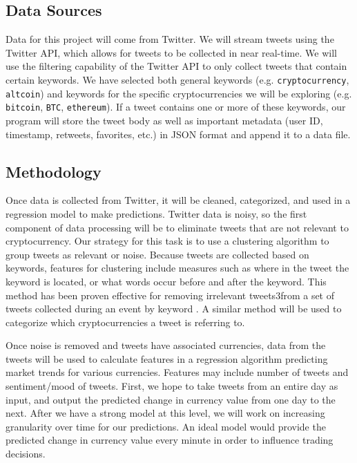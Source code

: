 \documentclass[sigconf]{acmart}
\newcommand{\code}{\texttt}
\begin{document}
\subsection{Data Sources}
Data for this project will come from Twitter. We will stream tweets using the Twitter API, which allows for tweets to be collected in near real-time. We will use the filtering capability of the Twitter API to only collect tweets that contain certain keywords\cite{sakai}. We have selected both general keywords (e.g. \code{cryptocurrency}, \code{altcoin}) and keywords for the specific cryptocurrencies we will be exploring (e.g. \code{bitcoin}, \code{BTC}, \code{ethereum}). If a tweet contains one or more of these keywords, our program will store the tweet body as well as important metadata (user ID, timestamp, retweets, favorites, etc.) in JSON format and append it to a data file.

\subsection{Methodology}
Once data is collected from Twitter, it will be cleaned, categorized, and used in a regression model to make predictions. Twitter data is noisy, so the first component of data processing will be to eliminate tweets that are not relevant to cryptocurrency. Our strategy for this task is to use a clustering algorithm to group tweets as relevant or noise. Because tweets are collected based on keywords, features for clustering include measures such as where in the tweet the keyword is located, or what words occur before and after the keyword. This method has been proven effective for removing irrelevant tweets3from a set of tweets collected during an event by keyword . A similar method will be used to categorize which cryptocurrencies a tweet is referring to.

Once noise is removed and tweets have associated currencies, data from the tweets will be used to calculate features in a regression algorithm predicting market trends for various currencies. Features may include number of tweets and sentiment/mood of tweets. First, we hope to take tweets from an entire day as input, and output the predicted change in currency value from one day to the next. After we have a strong model at this level, we will work on increasing granularity over time for our predictions. An ideal model would provide the predicted change in currency value every minute in order to influence trading decisions.

\end{document}
